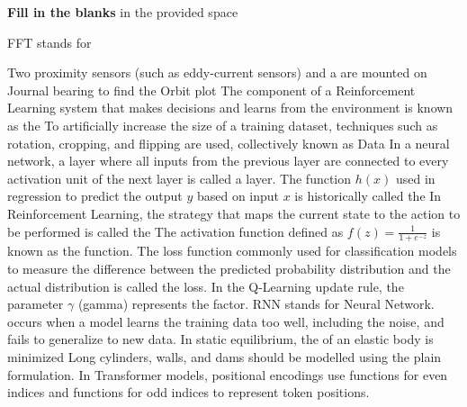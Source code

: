 \documentclass[12pt]{exam}
\begin{document}
        \begin{center}

            \textbf{Fill in the blanks} in the provided space
        \end{center}
        \begin{questions}
        
		
		
           \question FFT stands for \makebox[1.8in]{\hrulefill}
    
           \question Two proximity sensors (such as eddy-current sensors) and a \makebox[1.8in]{\hrulefill} are mounted on Journal bearing to find the Orbit plot
            \question The component of a Reinforcement Learning system that makes decisions and learns from the environment is known as the \makebox[1.8in]{\hrulefill} %
            \question To artificially increase the size of a training dataset, techniques such as rotation, cropping, and flipping are used, collectively known as Data \makebox[1.8in]{\hrulefill} %
            \question In a neural network, a layer where all inputs from the previous layer are connected to every activation unit of the next layer is called a \makebox[1.8in]{\hrulefill} layer. %
            \question The function $h(x)$ used in regression to predict the output $y$ based on input $x$ is historically called the \makebox[1.8in]{\hrulefill} %
            \question In Reinforcement Learning, the strategy that maps the current state to the action to be performed is called the \makebox[1.8in]{\hrulefill} %
            \question The activation function defined as $f(z) = \frac{1}{1+e^{-z}}$ is known as the \makebox[1.8in]{\hrulefill} function. %
            \question The loss function commonly used for classification models to measure the difference between the predicted probability distribution and the actual distribution is called the \makebox[1.8in]{\hrulefill} loss. %
            \question In the Q-Learning update rule, the parameter $\gamma$ (gamma) represents the \makebox[1.2in]{\hrulefill} factor. %
            \question RNN stands for \makebox[1.8in]{\hrulefill} Neural Network. %
            \question \makebox[1.8in]{\hrulefill} occurs when a model learns the training data too well, including the noise, and fails to generalize to new data. %
            \question In static equilibrium, the \makebox[1.8in]{\hrulefill} of an elastic body is minimized
            \question Long cylinders, walls, and dams should be modelled using the plain \makebox[1.8in]{\hrulefill} formulation.
            \question In Transformer models, positional encodings use \makebox[1.5in]{\hrulefill} functions for even indices and \makebox[1.5in]{\hrulefill} functions for odd indices to represent token positions. %

        \end{questions}
        \setcounter{question}{0}
\end{document}
